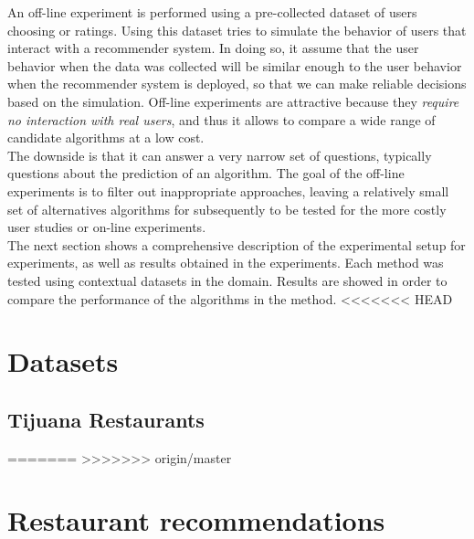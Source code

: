 An off-line experiment is performed using a pre-collected dataset
of users choosing or ratings. Using this dataset tries to simulate
the behavior of users that interact with a recommender system. In
doing so, it assume that the user behavior when the data was collected
will be similar enough to the user behavior when the recommender
system is deployed, so that we can make reliable decisions based on
the simulation.  Off-line experiments are attractive because they
\textit{require no interaction with real users}, and thus it allows to compare
a wide range of candidate algorithms at a low cost. \\ The downside is
that it can answer a very narrow set of questions, typically questions
about the prediction of an algorithm. The goal of the off-line
experiments is to filter out inappropriate  approaches, leaving a
relatively small set of alternatives algorithms for subsequently to be
tested for the more costly user studies or on-line 
experiments\cite{adomavicius2011context}.\\ 
The next section shows a comprehensive description of the 
experimental setup for experiments, as well as results obtained 
in the experiments.
Each method was tested using contextual datasets in the domain. 
Results are showed in order to  compare the performance of the 
algorithms in the method. 
<<<<<<< HEAD


\section{Datasets} 

\subsection{Tijuana Restaurants} 
=======
>>>>>>> origin/master
\section{Restaurant recommendations} 

